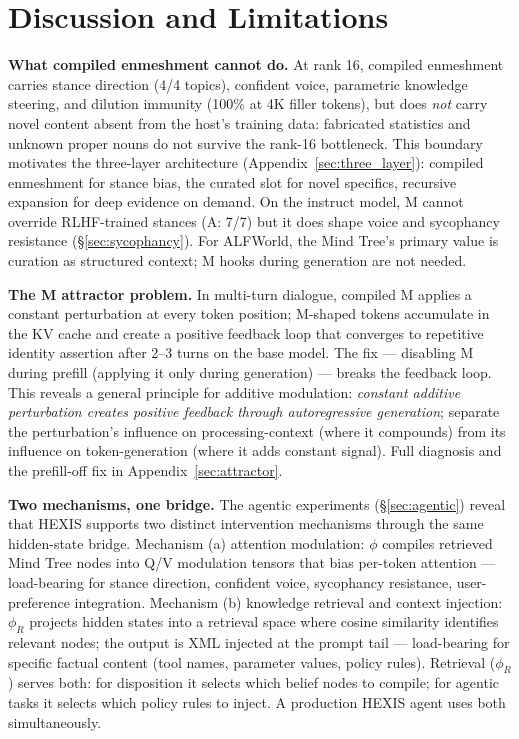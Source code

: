 \section{Discussion and Limitations}
\label{sec:discussion}

\textbf{What compiled enmeshment cannot do.} At rank 16, compiled enmeshment carries stance direction (4/4 topics), confident voice, parametric knowledge steering, and dilution immunity (100\% at 4K filler tokens), but does \emph{not} carry novel content absent from the host's training data: fabricated statistics and unknown proper nouns do not survive the rank-16 bottleneck. This boundary motivates the three-layer architecture (Appendix~\ref{sec:three_layer}): compiled enmeshment for stance bias, the curated slot for novel specifics, recursive expansion for deep evidence on demand. On the instruct model, M cannot override RLHF-trained stances (A: 7/7) but it does shape voice and sycophancy resistance (\S\ref{sec:sycophancy}). For ALFWorld, the Mind Tree's primary value is curation as structured context; M hooks during generation are not needed.

\textbf{The M attractor problem.} In multi-turn dialogue, compiled M applies a constant perturbation at every token position; M-shaped tokens accumulate in the KV cache and create a positive feedback loop that converges to repetitive identity assertion after 2--3 turns on the base model. The fix --- disabling M during prefill (applying it only during generation) --- breaks the feedback loop. This reveals a general principle for additive modulation: \emph{constant additive perturbation creates positive feedback through autoregressive generation}; separate the perturbation's influence on processing-context (where it compounds) from its influence on token-generation (where it adds constant signal). Full diagnosis and the prefill-off fix in Appendix~\ref{sec:attractor}.

\textbf{Two mechanisms, one bridge.} The agentic experiments (\S\ref{sec:agentic}) reveal that HEXIS supports two distinct intervention mechanisms through the same hidden-state bridge. Mechanism (a) attention modulation: $\phi$ compiles retrieved Mind Tree nodes into Q/V modulation tensors that bias per-token attention --- load-bearing for stance direction, confident voice, sycophancy resistance, user-preference integration. Mechanism (b) knowledge retrieval and context injection: $\phi_R$ projects hidden states into a retrieval space where cosine similarity identifies relevant nodes; the output is XML injected at the prompt tail --- load-bearing for specific factual content (tool names, parameter values, policy rules). Retrieval ($\phi_R$) serves both: for disposition it selects which belief nodes to compile; for agentic tasks it selects which policy rules to inject. A production HEXIS agent uses both simultaneously.

